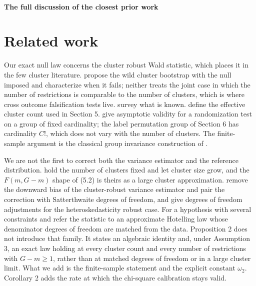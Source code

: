 \documentclass[12pt]{article}
\theoremstyle{definition}
\numberwithin{equation}{section}
\begin{document}
\paragraph{The full discussion of the closest prior work}

\section{Related work}

Our exact null law concerns the cluster robust Wald statistic, which places it
in the few cluster literature. \citet{cameron2008bootstrap} propose the wild
cluster bootstrap with the null imposed and \citet{mackinnon2017wild}
characterize when it fails; neither treats the joint case in which the number of
restrictions is comparable to the number of clusters, which is where cross
outcome falsification tests live. \citet{mackinnon2023guide} survey what is
known. \citet{carter2017cluster} define the effective
cluster count used in Section 5. \citet{canay2017randomization}
give asymptotic validity for a randomization test on a group of fixed
cardinality; the label permutation group of Section 6 has
cardinality $C!$, which does not vary with the number of clusters. The finite-sample argument is the classical group invariance construction of
\citet{lehmann2005testing}.

We are not the first to correct both the variance estimator and the reference
distribution. \citet{bester2011cluster} hold the number of clusters fixed and
let cluster size grow, and the $F(m,G-m)$ shape of (5.2) is theirs
as a large cluster approximation. \citet{bell2002bias} remove the downward bias
of the cluster-robust variance estimator and pair the correction with
Satterthwaite degrees of freedom, and \citet{imbens2016robust} give degrees of
freedom adjustments for the heteroskedasticity robust case. For a hypothesis
with several constraints \citet{tipton2015small} and \citet{pustejovsky2018small}
refer the statistic to an approximate Hotelling law whose denominator degrees of
freedom are matched from the data. Proposition 2 does not
introduce that family. It states an algebraic identity and, under Assumption
3, an exact law holding at every cluster count and every number of
restrictions with $G - m \ge 1$, rather than at matched degrees of freedom or in
a large cluster limit. What we add is the finite-sample statement and the
explicit constant $\omega_2$. Corollary 2 adds the rate at which
the chi-square calibration stays valid.
\end{document}
